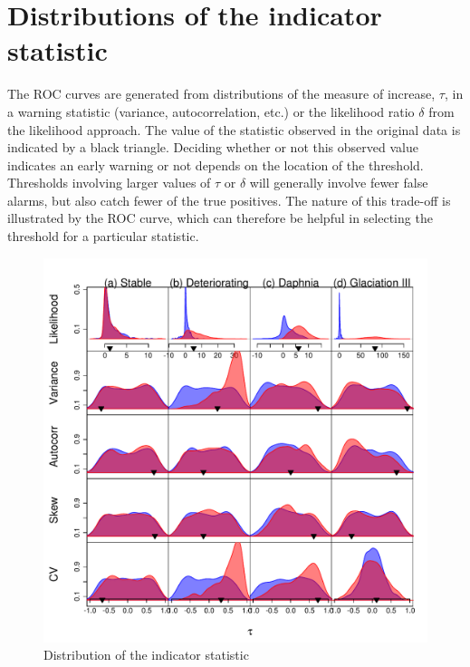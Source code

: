 \documentclass[11pt]{elsarticle}
\begin{document}
%

\section{Distributions of the indicator statistic}
The ROC curves are generated from distributions of the measure of increase, $\tau$, in a warning statistic (variance, autocorrelation, etc.) or the likelihood ratio $\delta$ from the likelihood approach.  The value of the statistic observed in the original data is indicated by a black triangle. Deciding whether or not this observed value indicates an early warning or not depends on the location of the threshold.  Thresholds involving larger values of $\tau$ or $\delta$ will generally involve fewer false alarms, but also catch fewer of the true positives.  The nature of this trade-off is illustrated by the ROC curve, which can therefore be helpful in selecting the threshold for a particular statistic.  


\begin{figure}[ht]
  \begin{center}
    \includegraphics{FigS1.pdf}
  \end{center}
  \caption{Distribution of the indicator statistic}
  \label{fig:S1}
\end{figure}
\end{document}
